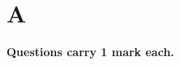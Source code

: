 \documentclass[book,11pt,onecolumn]{IEEEtran}
\renewcommand\thetable{\arabic{table}}
\begin{document}
\maketitle




\bigskip

\renewcommand{\thefigure}{\theenumi}
\renewcommand{\thetable}{\theenumi}

%




%
\section{\textbf{A}}
\textbf{Questions carry 1 mark each.}
\end{document}
